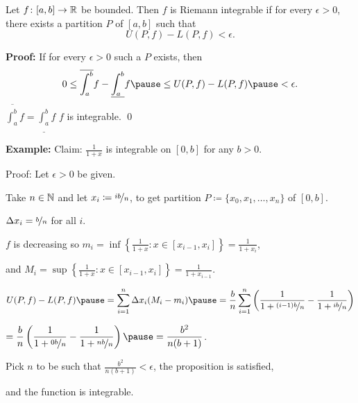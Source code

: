 \documentclass[10pt,aspectratio=149]{beamer}
\begin{document}
\begin{frame}

\begin{proposition}
Let $f \colon [a,b] \to {\mathbb{R}}$ be bounded.  Then $f$ is Riemann
integrable if for every $\epsilon > 0$, there exists a partition $P$ of
$[a,b]$ such that
\begin{equation*}
U(P,f) - L(P,f) < \epsilon .
\end{equation*}
\end{proposition}

\pause
\textbf{Proof:}
If for every $\epsilon > 0$ such a $P$ exists, then
\begin{equation*}
0 \leq
\overline{\int_a^b} f - 
\underline{\int_a^b} f
\pause
\leq
U(P,f) - L(P,f)
\pause
< \epsilon .
\end{equation*}
\pause
\thus \quad
$\displaystyle \overline{\int_a^b} f = \underline{\int_a^b} f$
\pause
\wthus
$f$ is integrable.
\qed

\end{frame}

\begin{frame}

\textbf{Example:}
Claim: $\frac{1}{1+x}$ is integrable on $[0,b]$ for any $b > 0$.

\pause
\medskip

Proof: Let $\epsilon > 0$ be given.

\pause
Take $n \in {\mathbb{N}}$ and
\pause
let $x_i \coloneqq \nicefrac{ib}{n}$,
\pause
to get partition
$P \coloneqq \{ x_0,x_1,\ldots,x_n \}$ of $[0,b]$.

\pause
$\Delta x_i = \nicefrac{b}{n}$ for all $i$.  

\pause
\medskip

$f$ is decreasing so
$
m_i = \inf \left\{ \frac{1}{1+x} : x \in [x_{i-1},x_i] \right\} =
\frac{1}{1+x_i}$,

\pause
and
$M_i = \sup \left\{ \frac{1}{1+x} : x \in [x_{i-1},x_i] \right\} =
\frac{1}{1+x_{i-1}}$.

\pause
\medskip

\thus \quad
$\displaystyle
U(P,f)-L(P,f)
\pause
=
\sum_{i=1}^n
\Delta x_i
(M_i-m_i)
\pause
=
\frac{b}{n}
\sum_{i=1}^n 
\left( \frac{1}{1+\nicefrac{(i-1)b}{n}} - \frac{1}{1+\nicefrac{ib}{n}} \right) 
$

\pause
\medskip

\qquad\qquad\qquad
$\displaystyle
=
\frac{b}{n}
\left( \frac{1}{1+\nicefrac{0b}{n}} - \frac{1}{1+\nicefrac{nb}{n}} \right) 
\pause
=
\frac{b^2}{n(b+1)}$.

\pause
\medskip

Pick $n$ to be such that
$\frac{b^2}{n(b+1)} < \epsilon$,
\pause
the proposition is satisfied,

\pause
and the function is integrable.
\end{frame}
\end{document}
